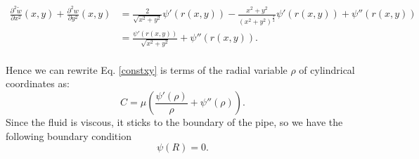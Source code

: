 \documentclass[DIV=12]{article}
\begin{document}
\begin{equation}
 \begin{array}{ll} 
\frac{\partial^2  {\tilde{w}}}{\partial x^2} (x,y)+ \frac{\partial^2 w }{\partial y^2} (x,y) &= \frac{2 }{ \sqrt{x^2 + y^2}} \psi'( r(x,y)) - \frac{x^2+ y^2}{(x^2 + y^2 )^{\frac{3}{2}}}\psi'( r(x,y)) + \psi''( r(x,y))\\
 &= \frac{\psi'( r(x,y) )}{\sqrt{x^2 + y^2}} +  \psi''( r(x,y)).\\
 \end{array}
\label{Laplace}
\end{equation}


Hence we can rewrite Eq. \ref{constxy} is terms of the radial variable $\rho$ of cylindrical coordinates as:
\begin{equation}
C = \mu\left( \frac{\psi'(\rho)}{\rho} + \psi''(\rho) \right).  
 \label{constrho}
\end{equation}
 Since the fluid is viscous, it sticks to the boundary of the pipe, 
 so we have the following boundary condition
\begin{equation}
 \psi( R ) = 0.
\end{equation}
\end{document}
